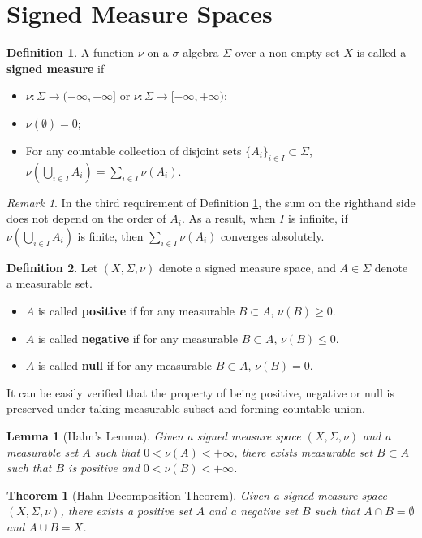 \documentclass[openany]{book}
\newtheorem{lemma}{Lemma}[chapter]
\newtheorem{theorem}{Theorem}[chapter]
\theoremstyle{definition}
\newtheorem{definition}{Definition}[chapter]
\theoremstyle{remark}
\newtheorem*{remark}{Remark}
\begin{document}
\section{Signed Measure Spaces}
\begin{definition}\label{def:signedMeasure}
    A function $\nu$ on a $\sigma$-algebra $\Sigma$ over a non-empty set $X$ is called a \textbf{signed measure} if
    \begin{itemize}
        \item $\nu:\Sigma\to(-\infty,+\infty]$ or $\nu:\Sigma\to[-\infty,+\infty)$;
        \item $\nu(\emptyset)=0$;
        \item For any countable collection of disjoint sets $\{A_i\}_{i\in I}\subset\Sigma$, $\nu\left(\bigcup_{i\in I}A_i\right)=\sum_{i\in I}\nu(A_i)$.
    \end{itemize}
\end{definition}
\begin{remark}
    In the third requirement of Definition \ref{def:signedMeasure}, the sum on the righthand side does not depend on the order of $A_i$. As a result, when $I$ is infinite, if $\nu\left(\bigcup_{i\in I}A_i\right)$ is finite, then $\sum_{i\in I}\nu(A_i)$ converges absolutely.
\end{remark}
\begin{definition}
    Let $(X,\Sigma,\nu)$ denote a signed measure space, and $A\in\Sigma$ denote a measurable set.
    \begin{itemize}
        \item $A$ is called \textbf{positive} if for any measurable $B\subset A$, $\nu(B)\ge0$.
        \item $A$ is called \textbf{negative} if for any measurable $B\subset A$, $\nu(B)\le0$.
        \item $A$ is called \textbf{null} if for any measurable $B\subset A$, $\nu(B)=0$.
    \end{itemize}
\end{definition}
It can be easily verified that the property of being positive, negative or null is preserved under taking measurable subset and forming countable union.
\begin{lemma}[Hahn's Lemma]
    Given a signed measure space $(X,\Sigma,\nu)$ and a measurable set $A$ such that $0<\nu(A)<+\infty$, there exists measurable set $B\subset A$ such that $B$ is positive and $0<\nu(B)<+\infty$.
\end{lemma}
\begin{theorem}[Hahn Decomposition Theorem]
    Given a signed measure space $(X,\Sigma,\nu)$, there exists a positive set $A$ and a negative set $B$ such that $A\cap B=\emptyset$ and $A\cup B=X$.
\end{theorem}
\end{document}
